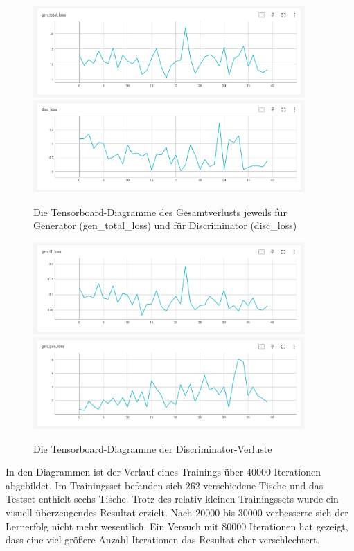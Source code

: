 \begin{figure}[h]
	\centering
	\includegraphics[width=0.925\textwidth]{bilder/pix2pix_progress/gen_total_loss.png}
	\includegraphics[width=0.925\textwidth]{bilder/pix2pix_progress/disc_loss.png}
	\caption[Lernerfolgsdiagramm 1]{Die Tensorboard-Diagramme des Gesamtverlusts jeweils für Generator (gen\_total\_loss) und für Discriminator (disc\_loss) }
	\includegraphics[width=0.925\textwidth]{bilder/pix2pix_progress/gen_l1_loss.png}
	\includegraphics[width=0.925\textwidth]{bilder/pix2pix_progress/gen_gan_loss.png}
	\caption[Lernerfolgsdiagramm 2]{Die Tensorboard-Diagramme der Discriminator-Verluste}
	\label{fig:pix2pixprogress4}
\end{figure}

\clearpage

In den Diagrammen ist der Verlauf eines Trainings über $40000$ Iterationen abgebildet. Im Trainingsset befanden sich 262 verschiedene Tische und das Testset enthielt sechs Tische. Trotz des relativ kleinen Trainingssets wurde ein visuell überzeugendes Resultat erzielt. Nach $20000$ bis $30000$ verbesserte sich der Lernerfolg nicht mehr wesentlich. Ein Versuch mit $80000$ Iterationen hat gezeigt, dass eine viel größere Anzahl Iterationen das Resultat eher verschlechtert.

